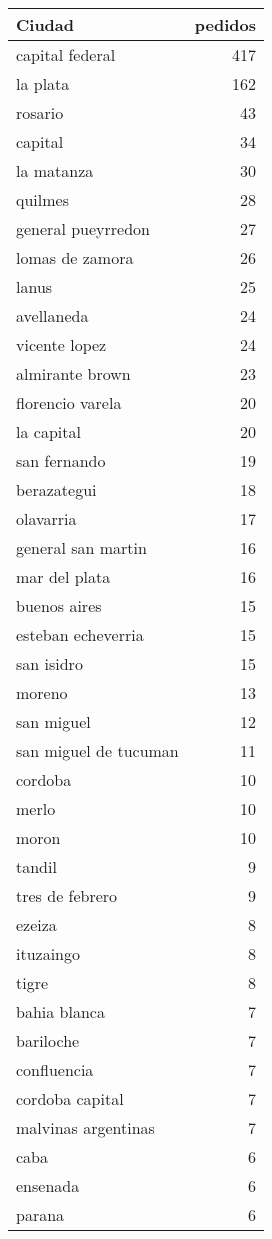 \documentclass[
]{article}
\begin{document}
\begin{longtable}[t]{lr}
\toprule
Ciudad & pedidos\\
\midrule
capital federal & 417\\
la plata & 162\\
rosario & 43\\
capital & 34\\
la matanza & 30\\
\addlinespace
quilmes & 28\\
general pueyrredon & 27\\
lomas de zamora & 26\\
lanus & 25\\
avellaneda & 24\\
\addlinespace
vicente lopez & 24\\
almirante brown & 23\\
florencio varela & 20\\
la capital & 20\\
san fernando & 19\\
\addlinespace
berazategui & 18\\
olavarria & 17\\
general san martin & 16\\
mar del plata & 16\\
buenos aires & 15\\
\addlinespace
esteban echeverria & 15\\
san isidro & 15\\
moreno & 13\\
san miguel & 12\\
san miguel de tucuman & 11\\
\addlinespace
cordoba & 10\\
merlo & 10\\
moron & 10\\
tandil & 9\\
tres de febrero & 9\\
\addlinespace
ezeiza & 8\\
ituzaingo & 8\\
tigre & 8\\
bahia blanca & 7\\
bariloche & 7\\
\addlinespace
confluencia & 7\\
cordoba capital & 7\\
malvinas argentinas & 7\\
caba & 6\\
ensenada & 6\\
\addlinespace
parana & 6\\

\end{longtable}
\end{document}
